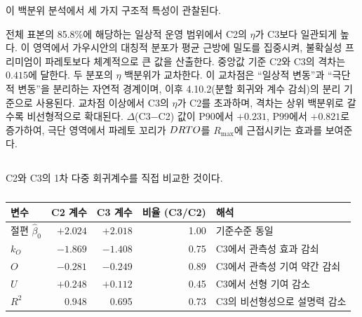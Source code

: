 이 백분위 분석에서 세 가지 구조적 특성이 관찰된다.

 전체 표본의 85.8\%에 해당하는 일상적 운영 범위에서
C2의 $\eta$가 C3보다 일관되게 높다. 이 영역에서 가우시안의 대칭적 분포가 평균 근방에 밀도를 집중시켜,
불확실성 프리미엄이 파레토보다 체계적으로 큰 값을 산출한다. 중앙값 기준 C2와 C3의 격차는 $0.415$에
달한다.  두 분포의 $\eta$ 백분위가 교차한다. 이 교차점은
``일상적 변동''과 ``극단적 변동''을 분리하는 자연적 경계이며, 이후 4.10.2(분할 회귀와 계수 감쇠)의 분리 기준으로 사용된다.  교차점 이상에서
C3의 $\eta$가 C2를 초과하며, 격차는 상위 백분위로 갈수록 비선형적으로 확대된다. $\Delta$(C3$-$C2) 값이
P90에서 $+0.231$, P99에서 $+0.821$로 증가하여, 극단 영역에서 파레토 꼬리가 $DRTO$를 $R_{\max}$에
근접시키는 효과를 보여준다.


\subsection{}
\label{subsec:c2c3_regression_coefficients}

 C2와 C3의 1차 다중 회귀계수를
직접 비교한 것이다.

\begin{table}[htbp]
  \centering
  \caption{}
  \label{tab:c2_c3_regression_comparison}
  \small
  \begin{tabular}{l rr r l}
    \toprule
    \textbf{변수} & \textbf{C2 계수} & \textbf{C3 계수} &
    \textbf{비율 (C3/C2)} & \textbf{해석} \\
    \midrule
    절편 $\hat{\beta}_0$ & $+2.024$ & $+2.018$ & 1.00 & 기준수준 동일 \\
    $k_O$ & $-1.869$ & $-1.408$ & 0.75 & C3에서 관측성 효과 감쇠 \\
    $O$ & $-0.281$ & $-0.249$ & 0.89 & C3에서 관측성 기여 약간 감쇠 \\
    $U$ & $+0.248$ & $+0.112$ & 0.45 & C3에서 선형 기여 감소 \\
    \midrule
    $R^2$ & 0.948 & 0.695 & 0.73 & C3의 비선형성으로 설명력 감소 \\
    \bottomrule
  \end{tabular}
\end{table}

